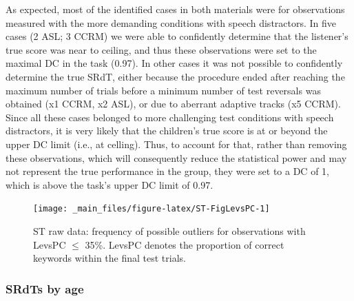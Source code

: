 \documentclass[a4paper, twoside]{templates/ociamthesis}
\begin{document}
As expected, most of the identified cases in both materials were for observations measured with the more demanding conditions with speech distractors. In five cases (2 ASL; 3 CCRM) we were able to confidently determine that the listener's true score was near to ceiling, and thus these observations were set to the maximal DC in the task (0.97). In other cases it was not possible to confidently determine the true SRdT, either because the procedure ended after reaching the maximum number of trials before a minimum number of test reversals was obtained (x1 CCRM, x2 ASL), or due to aberrant adaptive tracks (x5 CCRM). Since all these cases belonged to more challenging test conditions with speech distractors, it is very likely that the children's true score is at or beyond the upper DC limit (i.e., at celling). Thus, to account for that, rather than removing these observations, which will consequently reduce the statistical power and may not represent the true performance in the group, they were set to a DC of 1, which is above the task's upper DC limit of 0.97.\\

\begin{figure}
\texttt{[image: \_main\_files/figure-latex/ST-FigLevsPC-1]} \caption{ST raw data: frequency of possible outliers for observations with LevsPC $\leq$ 35\%. LevsPC denotes the proportion of correct keywords within the final test trials.}\label{fig:ST-FigLevsPC}
\end{figure}

\hypertarget{srdts-by-age}{%
\subsubsection*{SRdTs by age}\label{srdts-by-age}}
\end{document}
